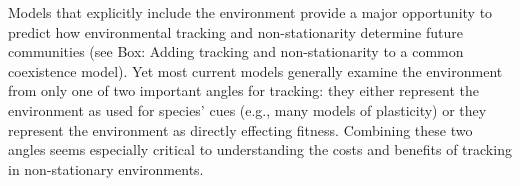 \documentclass[11pt,letterpaper]{article}
\begin{document}
Models that explicitly include the environment provide a major opportunity to predict how environmental tracking and non-stationarity determine future communities (see Box: Adding tracking and non-stationarity to a common coexistence model). Yet most current models generally examine the environment from only one of two important angles for tracking: they either represent the environment as used for species' cues (e.g., many models of plasticity) or they represent the environment as directly effecting fitness. Combining these two angles seems especially critical to understanding the costs and benefits of tracking in non-stationary environments. 


\end{document}
